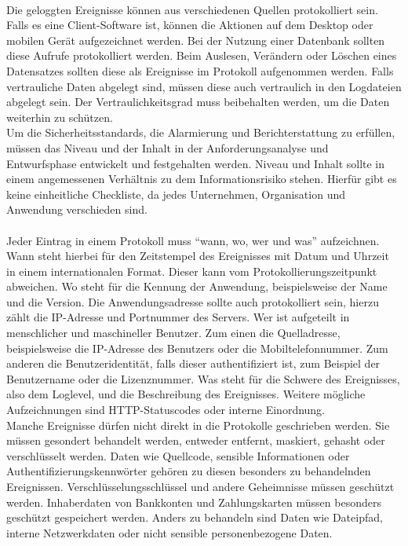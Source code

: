 \\
Die geloggten Ereignisse können aus verschiedenen Quellen protokolliert sein.
Falls es eine Client-Software ist, können die Aktionen auf dem Desktop oder mobilen Gerät aufgezeichnet werden.
Bei der Nutzung einer Datenbank sollten diese Aufrufe protokolliert werden.
Beim Auslesen, Verändern oder Löschen eines Datensatzes sollten diese als Ereignisse im Protokoll aufgenommen werden.
Falls vertrauliche Daten abgelegt sind, müssen diese auch vertraulich in den Logdateien abgelegt sein.
Der Vertraulichkeitsgrad muss beibehalten werden, um die Daten weiterhin zu schützen.
\\
Um die Sicherheitsstandards, die Alarmierung und Berichterstattung zu erfüllen, müssen das Niveau und der Inhalt in der Anforderungsanalyse und Entwurfsphase entwickelt und festgehalten werden.
Niveau und Inhalt sollte in einem angemessenen Verhältnis zu dem Informationsrisiko stehen.
Hierfür gibt es keine einheitliche Checkliste, da jedes Unternehmen, Organisation und Anwendung verschieden sind.
\\
\\
Jeder Eintrag in einem Protokoll muss \enquote{wann, wo, wer und was} aufzeichnen.
Wann steht hierbei für den Zeitstempel des Ereignisses mit Datum und Uhrzeit in einem internationalen Format.
Dieser kann vom Protokollierungszeitpunkt abweichen.
Wo steht für die Kennung der Anwendung, beispielsweise der Name und die Version.
Die Anwendungsadresse sollte auch protokolliert sein, hierzu zählt die IP-Adresse und Portnummer des Servers.
Wer ist aufgeteilt in menschlicher und maschineller Benutzer.
Zum einen die Quelladresse, beispielsweise die IP-Adresse des Benutzers oder die Mobiltelefonnummer.
Zum anderen die Benutzeridentität, falls dieser authentifiziert ist, zum Beispiel der Benutzername oder die Lizenznummer.
Was steht für die Schwere des Ereignisses, also dem Loglevel, und die Beschreibung des Ereignisses.
Weitere mögliche Aufzeichnungen sind HTTP-Statuscodes oder interne Einordnung.
\\
Manche Ereignisse dürfen nicht direkt in die Protokolle geschrieben werden.
Sie müssen gesondert behandelt werden, entweder entfernt, maskiert, gehasht oder verschlüsselt werden.
Daten wie Quellcode, sensible Informationen oder Authentifizierungskennwörter gehören zu diesen besonders zu behandelnden Ereignissen.
Verschlüsselungsschlüssel und andere Geheimnisse müssen geschützt werden.
Inhaberdaten von Bankkonten und Zahlungskarten müssen besonders geschützt gespeichert werden.
Anders zu behandeln sind Daten wie Dateipfad, interne Netzwerkdaten oder nicht sensible personenbezogene Daten.
